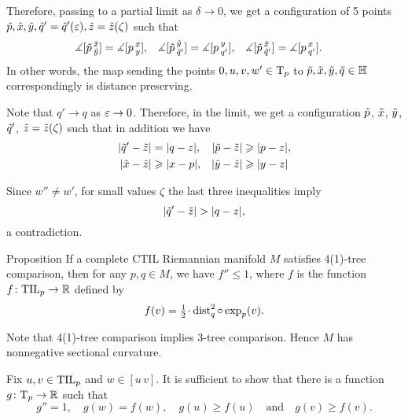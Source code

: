 Therefore, passing to a partial limit as $\delta\to0$, we get a configuration of 5 points 
$\~p, \~x,\~y,\~q'=\~q'(\eps),\~z=\~z(\zeta)$ such that  
\begin{align*}
\measuredangle[\~p\,^{\~x}_{\~y}]&= \measuredangle[p\,^{x}_{y}],
&
\measuredangle[\~p\,^{\~y}_{\~q'}]&= \measuredangle[p\,^{y}_{q'}],
&
\measuredangle[\~p\,^{\~x}_{\~q'}]&= \measuredangle[p\,^{x}_{q'}].
\end{align*}
In other words, the map sending the points $0,u,v,w'\in\T_p$ to $\~p,\~x,\~y,\~q\in\HH$ correspondingly is distance preserving.

Note that $q'\to q$ as $\eps\to0$. 
Therefore, in the limit,
we get a configuration $\~p$, $\~x$, $\~y$, $\~q'$, $\~z=\~z(\zeta)$ such that in addition we have
\begin{align*}
|\~q'-\~z|&=|q-z|,
&
|\~p-\~z|&\ge |p-z|,
\\
|\~x-\~z|&\ge |x-p|,
&
|\~y-\~z|&\ge |y-z|
\end{align*}

Since $w''\ne w'$, for small values $\zeta$ the last three inequalities 
imply 
\[|\~q'-\~z|>|q-z|,\]
a contradiction.

\begin{thm}{Proposition}\label{prop:convex}
If  a complete CTIL Riemannian manifold $M$ satisfies 4(1)-tree comparison,
then for any $p,q\in M$, we have $f''\le 1$, where $f$ is the function $f\: \TIL_p\to \RR$ defined by
\[f(v)=\tfrac12\cdot\dist_q^2\circ\exp_p(v).\]

\end{thm}

Note that 4(1)-tree comparison implies 3-tree comparison.
Hence $M$ has nonnegative sectional curvature.

Fix $u,v\in \TIL_p$ and $w\in [u\,v]$.
It is sufficient to show that there is a function $g\:\T_p\to \RR$ such that
\[g''=1,\quad
g(w)=f(w),\quad
g(u)\ge f(u)\quad
\text{and}\quad
g(v)\ge f(v).\]

